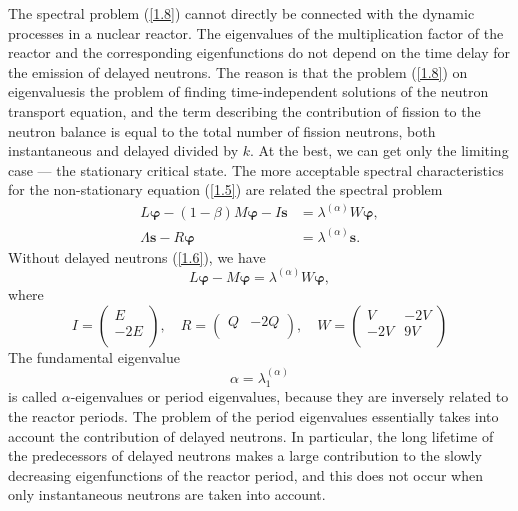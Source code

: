 \documentclass[authoryear]{elsarticle}
\begin{document}
The spectral problem (\ref{1.8}) cannot directly be connected with the
dynamic processes in a nuclear reactor. 
The eigenvalues of the multiplication factor of the reactor and the corresponding eigenfunctions do not depend on the time delay for the emission of delayed neutrons. 
The reason is that the problem (\ref{1.8}) on eigenvalues ​​is the problem of finding time-independent solutions of the neutron transport equation, and the term describing the contribution of fission to the neutron balance is equal to the total number of fission neutrons, both instantaneous and delayed divided by $k$.
At the best, we can get only the limiting case --- the stationary critical state.
The more acceptable spectral characteristics for the non-stationary equation (\ref{1.5}) are related the spectral problem
\begin{equation}\label{1.9}
\begin{split}
L \bm \varphi - (1 - \beta) M \bm \varphi - I \bm s &= \lambda^{(\alpha)} W \bm \varphi, \\
\Lambda \bm s - R \bm \varphi  &= \lambda^{(\alpha)} \bm s.
\end{split}
\end{equation}
Without delayed neutrons (\ref{1.6}), we have
\begin{equation}\label{1.10}
L \bm \varphi - M \bm \varphi = \lambda^{(\alpha)} W \bm \varphi,
\end{equation}
where
\[
I = \begin{pmatrix}
E \\
-2E \\
\end{pmatrix},
\quad
R = \begin{pmatrix}
Q & -2Q \\
\end{pmatrix},
\quad
W = \begin{pmatrix}
V & -2V \\
-2V & 9V \\
\end{pmatrix}
\]
The fundamental eigenvalue
\[ 
 \alpha = \lambda^{(\alpha)}_1
\]
is called \citep{bell1970} $\alpha$-eigenvalues or period eigenvalues, because they are inversely related to the reactor periods.
The problem of the period eigenvalues essentially takes into account the contribution of delayed neutrons.
In particular, the long lifetime of the predecessors of delayed neutrons makes a large contribution to the slowly decreasing eigenfunctions of the reactor period, and this does not occur when only instantaneous neutrons are taken into account.
\end{document}
